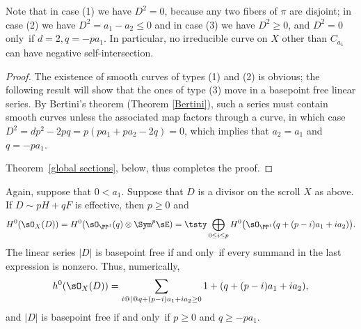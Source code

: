 Note that in case (1) we have $D^{2} = 0$, because any two fibers of $\pi$
are disjoint; in case (2) we have $D^{2}= a_{1}-a_{2}\leq 0$ and in case
(3) we have $D^{2}\geq 0$, and $D^2=0$ only~if
$d=2, q = -pa_1$. In particular, no irreducible curve
on $X$ other than $C_{a_1}$ can have negative self-intersection.

\begin{proof}
The existence of smooth curves of types (1) and (2) is obvious; the following
result will show that
the ones of type (3) move in a basepoint free linear series. By 
Bertini's theorem
%
(Theorem \ref{Bertini}), such a series must contain smooth curves unless the
associated map factors through a curve, in which case $D^2 = dp^2-2pq =
p(pa_1+pa_2 -2 q) = 0$, which implies that $a_2=a_1$ and $q= -pa_1$.

Theorem~\ref{global sections}, below, thus completes the proof.
\end{proof}

\begin{theorem}\label{global sections} Again, suppose that $0<a_{1}$.
Suppose that $D$ is a divisor on the scroll $X$ as above. If $D \sim
pH+qF$ is effective,  then $p\geq 0$ and
$$
H^{0}(\sO_{X}(D)) = H^{0}(\sO_{\PP^{1}}(q) \otimes \Sym^{p} \sE)
=
\tsty\bigoplus\limits_{0\leq i\leq p}H^{0}\bigl(\sO_{\PP^{1}}(q + (p-i)a_{1}+i
a_{2})\bigr).
$$
The linear series $|D|$ is basepoint free if and only~if every summand
%
in the last expression is nonzero.
Thus, numerically,
$$
h^{0}(\sO_{X}(D)) =
\sum_{i @\mid@ q+(p-i)a_{1}+i a_{2} \geq 0}1+(q + (p-i)a_{1}+i a_{2}),
$$
and
$|D|$ is basepoint free if and only~if $p\geq 0$ and $q\geq -pa_{1}$.
\unif
\end{theorem}

